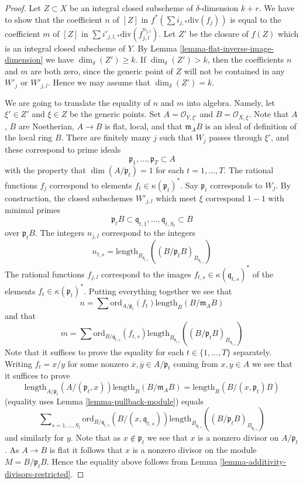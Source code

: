 \begin{proof}
\medskip\noindent
Let $Z \subset X$ be an integral closed subscheme of $\delta$-dimension
$k + r$. We have to show that the coefficient $n$ of $[Z]$ in
$f^*(\sum i_{j, *}\text{div}(f_j))$ is equal to the coefficient
$m$ of $[Z]$ in $\sum i'_{j, l, *} \text{div}(f_{j, l}^{n_{j, l}})$.
Let $Z'$ be the closure of $f(Z)$ which is an integral closed
subscheme of $Y$. By Lemma \ref{lemma-flat-inverse-image-dimension}
we have $\dim_\delta(Z') \geq k$.
If $\dim_\delta(Z') > k$, then the coefficients $n$ and $m$ are
both zero, since the generic point of $Z$ will not be contained
in any $W'_j$ or $W'_{j, l}$. Hence we may assume that $\dim_\delta(Z') = k$.

\medskip\noindent
We are going to translate the equality of $n$ and $m$ into algebra.
Namely, let $\xi' \in Z'$ and $\xi \in Z$ be the generic points.
Set $A = \mathcal{O}_{Y, \xi'}$ and $B = \mathcal{O}_{X, \xi}$.
Note that $A$, $B$ are Noetherian, $A \to B$ is flat, local,
and that $\mathfrak m_AB$ is an ideal of definition of the local ring $B$.
There are finitely many $j$ such that $W_j$ passes through
$\xi'$, and these correspond to prime ideals
$$
\mathfrak p_1, \ldots, \mathfrak p_T \subset A
$$
with the property that $\dim(A/\mathfrak p_t) = 1$ for each
$t = 1, \ldots, T$. The rational functions $f_j$ correspond
to elements $f_t \in \kappa(\mathfrak p_t)^*$.
Say $\mathfrak p_t$ corresponds to $W_j$.
By construction, the closed subschemes $W'_{j, l}$ which meet
$\xi$ correspond $1 - 1$ with minimal primes
$$
\mathfrak p_tB
\subset
\mathfrak q_{t, 1}, \ldots, \mathfrak q_{t, S_t}
\subset
B
$$
over $\mathfrak p_tB$.
The integers $n_{j, l}$ correspond to the integers
$$
n_{t, s} = \text{length}_{B_{\mathfrak q_{t, s}}}
((B/\mathfrak p_tB)_{B_{\mathfrak q_{t, s}}})
$$
The rational functions $f_{j, l}$ correspond to the images
$f_{t, s} \in \kappa(\mathfrak q_{t, s})^*$ of the elements
$f_t \in \kappa(\mathfrak p_t)^*$. Putting everything together
we see that
$$
n = \sum \text{ord}_{A/\mathfrak p_t}(f_t)\text{length}_B(B/\mathfrak m_AB)
$$
and that
$$
m = \sum \text{ord}_{B/\mathfrak q_{t, s}}(f_{t, s})
\text{length}_{B_{\mathfrak q_{t, s}}}
((B/\mathfrak p_tB)_{B_{\mathfrak q_{t, s}}})
$$
Note that it suffices to prove the equality for each
$t \in \{1, \ldots, T\}$ separately. Writing $f_t = x/y$
for some nonzero $\overline{x}, \overline{y} \in A/\mathfrak p_t$
coming from $x, y\in A$ we see that it suffices
to prove
$$
\text{length}_{A/\mathfrak p_t}(A/(\mathfrak p_t, x))
\text{length}_B(B/\mathfrak m_AB)
=
\text{length}_B(B/(x, \mathfrak p_t)B)
$$
(equality uses Lemma \ref{lemma-pullback-module})
equals
$$
\sum\nolimits_{s = 1, \ldots, S_t}
\text{ord}_{B/\mathfrak q_{t, s}}(B/(x, \mathfrak q_{t, s}))
\text{length}_{B_{\mathfrak q_{t, s}}}
((B/\mathfrak p_tB)_{B_{\mathfrak q_{t, s}}})
$$
and similarly for $y$. Note that as $x \not \in \mathfrak p_t$ we
see that $x$ is a nonzero divisor on $A/\mathfrak p_t$. As $A \to B$
is flat it follows that $x$ is a nonzero divisor on the module
$M = B/\mathfrak p_tB$. Hence the equality above follows from
Lemma \ref{lemma-additivity-divisors-restricted}.
\end{proof}

